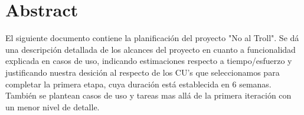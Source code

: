 \section{Abstract}
El siguiente documento contiene la planificación del proyecto "No al Troll".
Se dá una descripción detallada de los alcances del proyecto en cuanto a funcionalidad explicada en casos de uso, indicando estimaciones respecto a tiempo/esfuerzo y justificando nuestra desición al respecto de los CU's que seleccionamos para completar la primera etapa, cuya duración está establecida en 6 semanas. 
También se plantean casos de uso y tareas mas allá de la primera iteración con un menor nivel de detalle.

